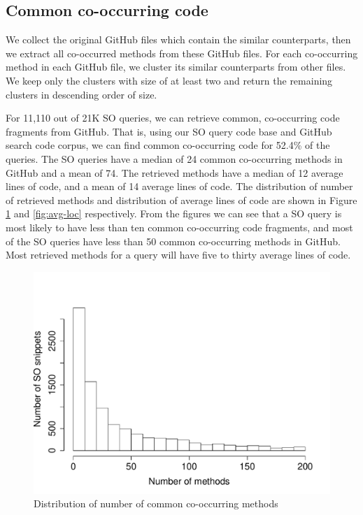 \subsection{Common co-occurring code}

We collect the original GitHub files which contain the similar counterparts, then we extract all co-occurred methods from these GitHub files. For each co-occurring method in each GitHub file, we cluster its similar counterparts from other files. We keep only the clusters with size of at least two and return the remaining clusters in descending order of size.

For 11,110 out of 21K SO queries, we can retrieve common, co-occurring code fragments from GitHub. That is, using our SO query code base and GitHub search code corpus, we can find common co-occurring code for 52.4\% of the queries. The SO queries have a median of 24 common co-occurring methods in GitHub and a mean of 74. The retrieved methods have a median of 12 average lines of code, and a mean of 14 average lines of code. The distribution of number of retrieved methods and distribution of average lines of code are shown in Figure \ref{fig:num-related} and \ref{fig:avg-loc} respectively.
From the figures we can see that a SO query is most likely to have less than ten common co-occurring code fragments, and most of the SO queries have less than 50 common co-occurring methods in GitHub. Most retrieved methods for a query will have five to thirty average lines of code.

\begin{figure}
	\includegraphics[scale=0.4]{figures/dist-related.pdf}
	\caption{Distribution of number of common co-occurring methods}
	\label{fig:num-related}
\end{figure}

